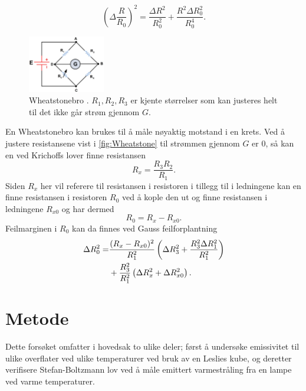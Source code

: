 \begin{equation}
  \label{eq:ErrorRelRes}
  \left( \Delta \frac{R}{R_{0}} \right) ^{2} = \frac{\Delta R^{2}}{R_{0}^{2}} + \frac{R^{2} \Delta R_{0}^{2}}{R_{0}^{4}}.
\end{equation}


\begin{figure}
  \centering
  \includegraphics[width=0.30\textwidth]{wheat.jpg}
  \caption{Wheatstonebro \cite{wheatstone}. $R_{1}, R_{2}, R_{3}$ er kjente størrelser som kan justeres helt til det ikke går strøm gjennom $G$.}
  \label{fig:Wheatstone}
\end{figure}

En Wheatstonebro kan brukes til å måle nøyaktig motstand i en krets. Ved å justere resistansene vist i \autoref{fig:Wheatstone} til strømmen gjennom $G$ er 0, så kan en ved Krichoffs lover finne resistansen
\begin{equation}
  \label{eq:Wheatstone}
  R_{x} = \frac{R_{3} R_{2}}{R_{1}}.
\end{equation}
Siden $R_{x}$ her vil referere til resistansen i resistoren i tillegg til i ledningene kan en finne resistansen i resistoren $R_{0}$ ved å kople den ut og finne resistansen i ledningene $R_{x0}$ og har dermed
\begin{equation}
  \label{eq:WheatstoneReal}
  R_{0} = R_{x} - R_{x0}.
\end{equation}
Feilmarginen i $R_{0}$ kan da finnes ved Gauss feilforplantning
\begin{align}
  \label{eq:ErrorBridge}
  \Delta R_{0}^{2} =& \frac{(R_{x} - R_{x0})^{2}}{R_{1}^{2}} \left( \Delta R_{3}^{2} + \frac{R_{3}^{2} \Delta R_{1}^{2}}{R_{1}^{2}} \right) \notag \\
  &+ \frac{R_{3}^{2}}{R_{1}^{2}} \left( \Delta R_{x}^{2} + \Delta R_{x0}^{2} \right).
\end{align}



\section{Metode}
Dette forsøket omfatter i hovedsak to ulike deler; først å undersøke emissivitet til ulike overflater ved ulike temperaturer ved bruk av en Leslies kube, og deretter verifisere Stefan-Boltzmann lov ved å måle emittert varmestråling fra en lampe ved varme temperaturer.


